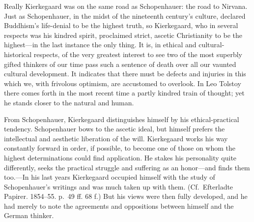 \documentclass[12pt,a4paper]{book}
\newcommand{\opage}[1]{\marginnote{\footnotesize\textit{[#1]}}}
\begin{document}
Really Kierkegaard was on the same road as Schopenhauer: the road to
Nirvana. Just as Schopenhauer, in the midst of the nineteenth century's
culture, declared Buddhism's life-denial to be the highest truth, so
Kierkegaard, who in several respects was his kindred spirit, proclaimed
strict, ascetic Christianity to be the highest---in the last instance the
only thing. It is, in ethical and cultural-historical respects, of the
very
\opage{116}greatest interest to see two of the most superbly gifted
thinkers of our time pass such a sentence of death over all our vaunted
cultural development. It indicates that there must be defects and
injuries in this which we, with frivolous optimism, are accustomed to
overlook. In Leo Tolstoy there comes forth in the most recent time a
partly kindred train of thought; yet he stands closer to the natural and
human.

From Schopenhauer, Kierkegaard distinguishes himself by his
ethical-practical tendency. Schopenhauer bows to the ascetic ideal, but
himself prefers the intellectual and aesthetic liberation of the will.
Kierkegaard works his way constantly forward in order, if possible, to
become one of those on whom the highest determinations could find
application. He stakes his personality quite differently, seeks the
practical struggle and suffering as an honor---and finds them
too.---In his last years Kierkegaard occupied himself with the study of
Schopenhauer's writings and was much taken up with them.
(Cf.\ Efterladte Papirer. 1854--55. p.~49 ff. 68 f.) But his views were
then fully developed, and he had merely to note the agreements and
oppositions between himself and the German thinker.
\end{document}
